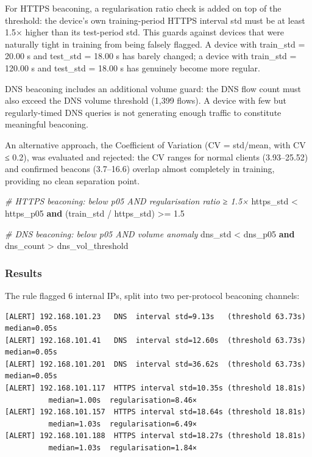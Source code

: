 \documentclass[
  11pt,
]{article}
\newenvironment{Shaded}{\vspace{4pt}}{\vspace{4pt}}
\newcommand{\CommentTok}[1]{\textcolor[rgb]{0.38,0.63,0.69}{\textit{#1}}}
\newcommand{\FloatTok}[1]{\textcolor[rgb]{0.25,0.63,0.44}{#1}}
\newcommand{\KeywordTok}[1]{\textcolor[rgb]{0.00,0.44,0.13}{\textbf{#1}}}
\newcommand{\NormalTok}[1]{#1}
\newcommand{\OperatorTok}[1]{\textcolor[rgb]{0.40,0.40,0.40}{#1}}
\begin{document}
For HTTPS beaconing, a regularisation ratio check is added on top of the
threshold: the device's own training-period HTTPS interval std must be
at least 1.5× higher than its test-period std. This guards against
devices that were naturally tight in training from being falsely
flagged. A device with train\_std = 20.00 s and test\_std = 18.00 s has
barely changed; a device with train\_std = 120.00 s and test\_std =
18.00 s has genuinely become more regular.

DNS beaconing includes an additional volume guard: the DNS flow count
must also exceed the DNS volume threshold (1,399 flows). A device with
few but regularly-timed DNS queries is not generating enough traffic to
constitute meaningful beaconing.

An alternative approach, the Coefficient of Variation (CV = std/mean,
with CV ≤ 0.2), was evaluated and rejected: the CV ranges for normal
clients (3.93--25.52) and confirmed beacons (3.7--16.6) overlap almost
completely in training, providing no clean separation point.

\begin{Shaded}
\begin{Highlighting}[]
\CommentTok{\# HTTPS beaconing: below p05 AND regularisation ratio ≥ 1.5×}
\NormalTok{https\_std }\OperatorTok{\textless{}}\NormalTok{ https\_p05  }\KeywordTok{and}\NormalTok{  (train\_std }\OperatorTok{/}\NormalTok{ https\_std) }\OperatorTok{\textgreater{}=} \FloatTok{1.5}

\CommentTok{\# DNS beaconing: below p05 AND volume anomaly}
\NormalTok{dns\_std }\OperatorTok{\textless{}}\NormalTok{ dns\_p05  }\KeywordTok{and}\NormalTok{  dns\_count }\OperatorTok{\textgreater{}}\NormalTok{ dns\_vol\_threshold}
\end{Highlighting}
\end{Shaded}

\hypertarget{results-2}{%
\subsubsection{Results}\label{results-2}}

The rule flagged 6 internal IPs, split into two per-protocol beaconing
channels:

\begin{verbatim}
[ALERT] 192.168.101.23   DNS  interval std=9.13s   (threshold 63.73s)  median=0.05s
[ALERT] 192.168.101.41   DNS  interval std=12.60s  (threshold 63.73s)  median=0.05s
[ALERT] 192.168.101.201  DNS  interval std=36.62s  (threshold 63.73s)  median=0.05s
[ALERT] 192.168.101.117  HTTPS interval std=10.35s (threshold 18.81s)
          median=1.00s  regularisation=8.46×
[ALERT] 192.168.101.157  HTTPS interval std=18.64s (threshold 18.81s)
          median=1.03s  regularisation=6.49×
[ALERT] 192.168.101.188  HTTPS interval std=18.27s (threshold 18.81s)
          median=1.03s  regularisation=1.84×
\end{verbatim}
\end{document}
